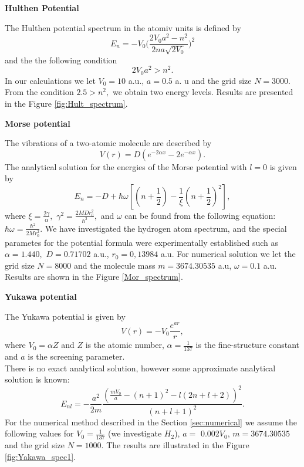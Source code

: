 \documentclass[a4paper, 12pt]{article}
\begin{document}
\begin{center}
		\large
		\textbf{Hulthen Potential}		\\[0.5 cm]
\end{center}
The Hulthen potential spectrum in the atomiv units is defined by
$$E_n = -V_0\bigg(\frac{2 V_0 a^2 - n^2}{2n a \sqrt{2V_0}}\bigg)^2$$
and the the following condition
$$2 V_0 a^2 > n^2.$$
In our calculations we let  $V_0 = 10$ a.u., $a = 0.5$ a. u and the grid size $N = 3000$.  From the condition  $2.5 > n^2,$ we obtain  two energy levels. Results are presented in the Figure \ref{fig:Hult_spectrum}.


\begin{center}
		\large
		\textbf{Morse potential}		\\[0.5 cm]
\end{center}
The vibrations of a two-atomic molecule are described by
$$V(r) = D(e^{-2\alpha x} - 2e^{-\alpha x}).$$
The analytical solution for the energies of the Morse potential with $l=0$ is given by
$$E_n = -D + \hbar \omega [(n+\frac{1}{2}) - \frac{1}{\xi}(n+\frac{1}{2})^2],$$
where $\xi = \frac{2 \gamma}{\alpha},$ $\gamma^2 = \frac{2 M D r_0^2}{\hbar^2},$ and $\omega$ can be found from the following equation: $\hbar \omega = \frac{\hbar^2}{2 M  r_0^2}.$
We have investigated  the hydrogen atom spectrum, and the special parametes for the potential formula were experimentally established such as $\alpha = 1.440,$  $D= 0.71702$ a.u., $r_0= 0,13984$ a.u. For numerical solution we let the grid size $N = 8000$ and the molecule mass $m = 3674.30535 $ a.u, $\omega  = 0.1 $ a.u. Results are shown in the Figure \ref{Mor_spectrum}.

\begin{center}
		\large
		\textbf{Yukawa potential}		\\[0.5 cm]
\end{center}
The Yukawa potential is given by
\begin{equation}\label{yukawa_pot}
    V(r) = -V_0\frac{e^{a r}}{r},
\end{equation}
where $V_0 = \alpha Z$ and $Z$ is the atomic number, $\alpha = \frac{1}{137}$ is the fine-structure constant and $a$ is the screening parameter.\\
There is no exact analytical solution, however some approximate analytical solution is known: 
$$E_{nl} = -\frac{a^2}{2m}\frac{(\displaystyle{\frac{m V_0}{a}} - (n+1)^2 - l(2n+l+2))^2}{(n+l+1)^2}.$$
For the numerical method described in the Section \ref{sec:numerical} we assume the following values for $V_0 = \frac{1}{137}$ (we investigate $H_2$), $a =$ 0.002$V_0$,  $m = 3674.30535 $ and the grid size $N = 1000.$ The results are illustrated in the Figure \ref{fig:Yakawa_spec1}.






\end{document}
